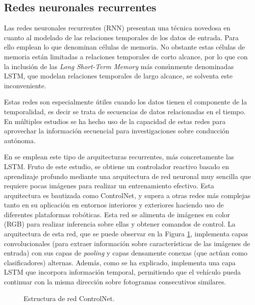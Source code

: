 \subsection{Redes neuronales recurrentes}

Las redes neuronales recurrentes (RNN) presentan una técnica novedosa en cuanto al modelado de las relaciones temporales de los datos de entrada. Para ello emplean lo que denominan células de memoria. No obstante estas células de memoria están limitadas a relaciones temporales de corto alcance, por lo que con la inclusión de las \textit{Long Short-Term Memory} más comúnmente denominadas LSTM, que modelan relaciones temporales de largo alcance, se solventa este inconveniente.

Estas redes son especialmente útiles cuando los datos tienen el componente de la temporalidad, es decir se trata de secuencias de datos relacionadas en el tiempo. En múltiples estudios se ha hecho uso de la capacidad de estas redes para aprovechar la información secuencial para investigaciones sobre conducción autónoma.

En \cite{reactive-ground} se emplean este tipo de arquitecturas recurrentes, más concretamente las LSTM. Fruto de este estudio, se obtiene un controlador reactivo basado en aprendizaje profundo mediante una arquitectura de red neuronal muy sencilla que requiere pocas imágenes para realizar un entrenamiento efectivo. Esta arquitectura es bautizada como ControlNet, y supera a otras redes más complejas tanto en su aplicación en entornos interiores y exteriores haciendo uso de diferentes plataformas robóticas. Esta red se alimenta de imágenes en color (RGB) para realizar inferencia sobre ellas y obtener comandos de control. La arquitectura de esta red, que se puede observar en la Figura \ref{fig.controlnet}, implementa capas convolucionales (para extraer información sobre características de las imágenes de entrada) con sus capas de \textit{pooling} y capas densamente conexas (que actúan como clasificadores) alternas. Además, como se ha explicado, implementa una capa LSTM que incorpora información temporal, permitiendo que el vehículo pueda continuar con la misma dirección sobre fotogramas consecutivos similares.

\begin{figure}
    \caption{Estructura de red ControlNet.}
	\label{fig.controlnet}

\end{figure}

